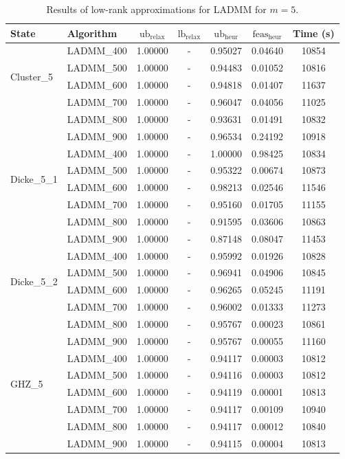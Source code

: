 \documentclass[smallextended]{svjour3}
\newcommand{\1}{\mathbf{1}}
\newcommand{\heur}{\text{heur}}
\newcommand{\relx}{\text{relax}}
\newcommand{\lb}{\text{lb}}
\newcommand{\ub}{\text{ub}}
\newcommand{\feas}{\text{feas}}
\begin{document}
\begin{table}[htb]
\centering
\begin{tabular}{l|l|ccccc}
\toprule
    \textbf{State} & \textbf{Algorithm} & $\ub_{\relx}$ & $\lb_{\relx}$ & $\ub_{\heur}$ & $\feas_{\heur}$ & \textbf{Time (s)} \\
\toprule

 \multirow{4}{*}{Cluster\_5}
& LADMM\_400 & 1.00000 & - & 0.95027 & 0.04640 & 10854 \\
 & LADMM\_500 & 1.00000 & - & 0.94483 & 0.01052 & 10816 \\
 & LADMM\_600 & 1.00000 & - & 0.94818 & 0.01407 & 11637 \\
 & LADMM\_700 & 1.00000 & - & 0.96047 & 0.04056 & 11025 \\
 & LADMM\_800 & 1.00000 & - & 0.93631 & 0.01491 & 10832 \\
 & LADMM\_900 & 1.00000 & - & 0.96534 & 0.24192 & 10918 \\

\midrule
 \multirow{4}{*}{Dicke\_5\_1}
& LADMM\_400 & 1.00000 & - & 1.00000 & 0.98425 & 10834 \\
 & LADMM\_500 & 1.00000 & - & 0.95322 & 0.00674 & 10873 \\
 & LADMM\_600 & 1.00000 & - & 0.98213 & 0.02546 & 11546 \\
 & LADMM\_700 & 1.00000 & - & 0.95160 & 0.01705 & 11155 \\
 & LADMM\_800 & 1.00000 & - & 0.91595 & 0.03606 & 10863 \\
 & LADMM\_900 & 1.00000 & - & 0.87148 & 0.08047 & 11453 \\

\midrule
 \multirow{4}{*}{Dicke\_5\_2}
& LADMM\_400 & 1.00000 & - & 0.95992 & 0.01926 & 10828 \\
 & LADMM\_500 & 1.00000 & - & 0.96941 & 0.04906 & 10845 \\
 & LADMM\_600 & 1.00000 & - & 0.96265 & 0.05245 & 11191 \\
 & LADMM\_700 & 1.00000 & - & 0.96002 & 0.01333 & 11273 \\
 & LADMM\_800 & 1.00000 & - & 0.95767 & 0.00023 & 10861 \\
 & LADMM\_900 & 1.00000 & - & 0.95767 & 0.00055 & 11160 \\

\midrule
 \multirow{4}{*}{GHZ\_5}
& LADMM\_400 & 1.00000 & - & 0.94117 & 0.00003 & 10812 \\
 & LADMM\_500 & 1.00000 & - & 0.94116 & 0.00003 & 10812 \\
 & LADMM\_600 & 1.00000 & - & 0.94119 & 0.00001 & 10813 \\
 & LADMM\_700 & 1.00000 & - & 0.94117 & 0.00109 & 10940 \\
 & LADMM\_800 & 1.00000 & - & 0.94117 & 0.00012 & 10840 \\
 & LADMM\_900 & 1.00000 & - & 0.94115 & 0.00004 & 10813 \\
\bottomrule

\end{tabular}
\caption{Results of low-rank approximations for LADMM for $m=5$.}
\label{tab.m5low}
\end{table}
\end{document}
